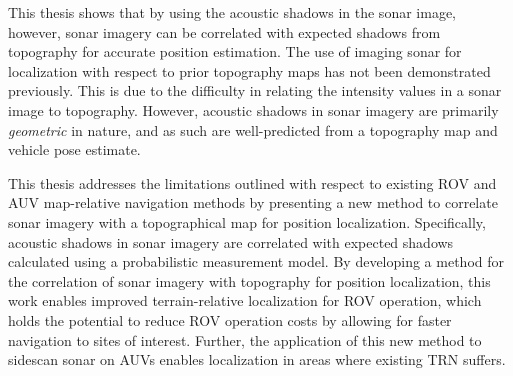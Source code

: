 This thesis shows that by using the acoustic shadows in the sonar image, however, sonar imagery can be correlated with expected shadows from topography for accurate position estimation.
The use of imaging sonar for localization with respect to prior topography maps has not been demonstrated previously.
This is due to the difficulty in relating the intensity values in a sonar image to topography.
However, acoustic shadows in sonar imagery are primarily \emph{geometric} in nature, and as such are well-predicted from a topography map and vehicle pose estimate.

This thesis addresses the limitations outlined with respect to existing ROV and AUV map-relative navigation methods by presenting a new method to correlate sonar imagery with a topographical map for position localization. Specifically, acoustic shadows in sonar imagery are correlated with expected shadows calculated using a probabilistic measurement model.  By developing a method for the correlation of sonar imagery with topography for position localization, this work enables improved terrain-relative localization for ROV operation, which holds the potential to reduce ROV operation costs by allowing for faster navigation to sites of interest.  Further, the application of this new method to sidescan sonar on AUVs enables localization in areas where existing TRN suffers.